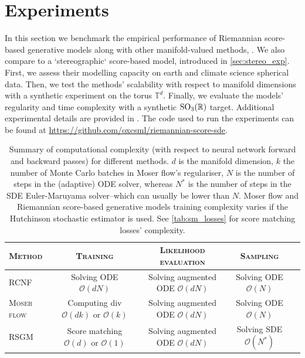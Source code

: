 \section{Experiments}
In this section we benchmark the empirical performance of Riemannian score-based generative models along with other manifold-valued methods, \textcite{peel2001fitting,rozen2021moser,mathieu2019continuous}.
We also compare to a `stereographic` score-based model, introduced in \cref{sec:stereo_exp}.
First, we assess their modelling capacity on earth and climate science spherical data.
Then, we test the methods' scalability with respect to manifold dimensions with a synthetic experiment on the torus \(\mathbb{T}^d\).
Finally, we evaluate the models' regularity and time complexity with a synthetic \(\mathrm{SO}_3(\mathbb{R})\) target.
Additional experimental details are provided in .
The code used to run the experiments can be found at \url{https://github.com/oxcsml/riemannian-score-sde}.
\label{sec:experiments-rsgm}
\begin{table}[t]
	\centering
	\small
	\renewcommand*{\arraystretch}{1.4}
	\begin{tabular}{l|cccc}
		\toprule
		\scshape{Method}     & \scshape{Training}                                                     & \scshape{Likelihood evaluation}                   & \scshape{Sampling}                     \\
		\midrule
		\scshape{RCNF}       & Solving ODE \(\mathcal{O}(dN)\)                                & Solving augmented ODE \(\mathcal{O}(dN)\) & Solving ODE \(\mathcal{O}(N)\) \\
		\scshape{Moser flow} & Computing \(\text{div}\) \(\mathcal{O}(dk)\) or \(\mathcal{O}(k)\) & Solving augmented ODE \(\mathcal{O}(dN)\) & Solving ODE \(\mathcal{O}(N)\) \\ \scshape{RSGM} & Score matching \(\mathcal{O}(d)\) or \(\mathcal{O}(1)\) & Solving augmented ODE \(\mathcal{O}(dN)\) & Solving SDE \(\mathcal{O}(N^*)\) \\ \bottomrule\end{tabular}

	\caption{ \small Summary of computational complexity (with respect to neural network forward and backward passes) for different methods.
		\(d\) is the manifold
		dimension, \(k\) the number of Monte Carlo batches in Moser flow's regulariser,
		\(N\) is the number of steps in the (adaptive) ODE solver, whereas \(N^*\) is the
		number of steps in the SDE Euler-Maruyama solver--which can usually be lower
		than \(N\).
		Moser flow and Riemannian score-based generative models training complexity varies if the Hutchinson stochastic estimator is used.
		See \cref{tab:sm_losses} for score matching losses' complexity.
	}
	\label{tab:comparison_methods}
\end{table}


